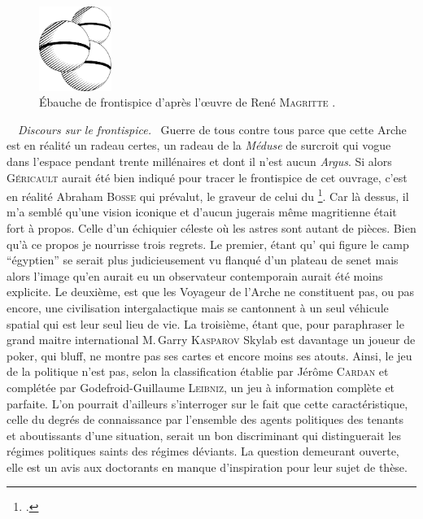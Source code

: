 \begin{figure}
	\vspace{-1em}
	\centering
	\includegraphics[width=0.21\textwidth]{frontispice-voix-des-airs.pdf}
	\caption{Ébauche de frontispice d’après l’œuvre de René \textsc{Magritte} .}
	\vspace{-2.0em}
\end{figure}
\
\
{\em\normalsize Discours sur le frontispice.}~
Guerre de tous contre tous parce que cette Arche est en réalité un radeau certes, un radeau de la \emph{Méduse} de surcroit qui vogue dans l’espace pendant trente millénaires et dont il n’est aucun \emph{Argus}. Si alors \textsc{Géricault} aurait été bien indiqué pour tracer le frontispice de cet ouvrage, c’est en réalité Abraham \textsc{Bosse} qui prévalut, le graveur de celui du \footcite{leviathan}. Car là dessus, il m’a semblé qu’une vision iconique et d’aucun jugerais même magritienne était fort à propos. Celle d’un échiquier céleste où les astres sont autant de pièces. Bien qu’à ce propos je nourrisse trois regrets. Le premier, étant qu’\elena{} qui figure le camp \enquote{égyptien} se serait plus judicieusement vu flanqué d’un plateau de senet mais alors l’image qu’en aurait eu un observateur contemporain aurait été moins explicite. Le deuxième, est que les Voyageur de l’Arche ne constituent pas, ou pas encore, une civilisation intergalactique mais se cantonnent à un seul véhicule spatial qui est leur seul lieu de vie. La troisième, étant que, pour paraphraser le grand maitre international M.\,Garry \textsc{Kasparov}  \elena{} Skylab est davantage un joueur de poker, qui bluff, ne montre pas ses cartes et encore moins ses atouts. Ainsi, le jeu de la politique n’est pas, selon la classification établie par Jérôme \textsc{Cardan} et complétée par Godefroid-Guillaume \textsc{Leibniz}, un jeu à information complète et parfaite. L’on pourrait d’ailleurs s’interroger sur le fait que cette caractéristique, celle du degrés de  connaissance par l’ensemble des agents politiques des tenants et aboutissants d’une situation, serait  un bon discriminant qui distinguerait les régimes politiques saints des régimes déviants. La question demeurant ouverte, elle est un avis aux doctorants en manque d’inspiration pour leur sujet de thèse.

